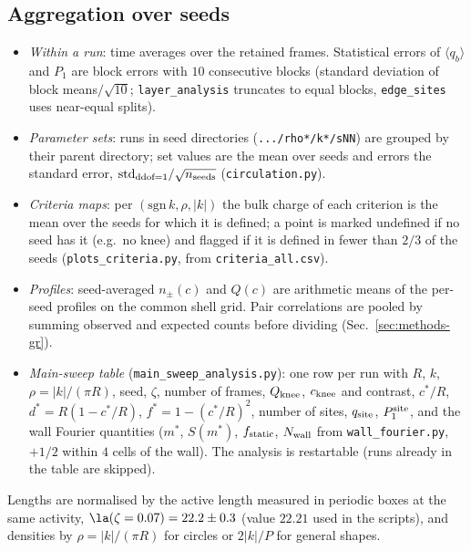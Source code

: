 \subsection{Aggregation over seeds}
\label{sec:methods-aggregate}

\begin{itemize}
  \item \emph{Within a run}: time averages over the retained frames. Statistical errors of $\langle q_b\rangle$
        and $P_1$ are block errors with $10$ consecutive blocks (standard deviation of block means$/\sqrt{10}$;
        \texttt{layer\_analysis} truncates to equal blocks, \texttt{edge\_sites} uses near-equal splits).
  \item \emph{Parameter sets}: runs in seed directories (\texttt{.../rho*/k*/sNN}) are grouped by their parent
        directory; set values are the mean over seeds and errors the standard error,
        $\mathrm{std}_{\rm ddof=1}/\sqrt{n_{\rm seeds}}$ (\texttt{circulation.py}).
  \item \emph{Criteria maps}: per $(\mathrm{sgn}\,k,\rho,|k|)$ the bulk charge of each criterion is the mean over the
        seeds for which it is defined; a point is marked undefined if no seed has it (e.g.\ no knee) and flagged if
        it is defined in fewer than $2/3$ of the seeds (\texttt{plots\_criteria.py}, from \texttt{criteria\_all.csv}).
  \item \emph{Profiles}: seed-averaged $n_\pm(c)$ and $Q(c)$ are arithmetic means of the per-seed profiles on the
        common shell grid. Pair correlations are pooled by summing observed and expected counts before dividing
        (Sec.~\ref{sec:methods-gr}).
  \item \emph{Main-sweep table} (\texttt{main\_sweep\_analysis.py}): one row per run with $R$, $k$, $\rho=|k|/(\pi R)$,
        seed, $\zeta$, number of frames, $Q_{\rm knee}$, $c_{\rm knee}$ and contrast, $c^*/R$, $d^*=R(1-c^*/R)$,
        $f^*=1-(c^*/R)^2$, number of sites, $q_{\rm site}$, $P_1^{\rm site}$, and the wall Fourier quantities
        ($m^*$, $S(m^*)$, $f_{\rm static}$, $N_{\rm wall}$ from \texttt{wall\_fourier.py}, $+1/2$ within $4$ cells of
        the wall). The analysis is restartable (runs already in the table are skipped).
\end{itemize}
Lengths are normalised by the active length measured in periodic boxes at the same activity,
$\la(\zeta=0.07)=22.2\pm0.3$ (value $22.21$ used in the scripts), and densities by $\rho=|k|/(\pi R)$ for circles or
$2|k|/P$ for general shapes.
